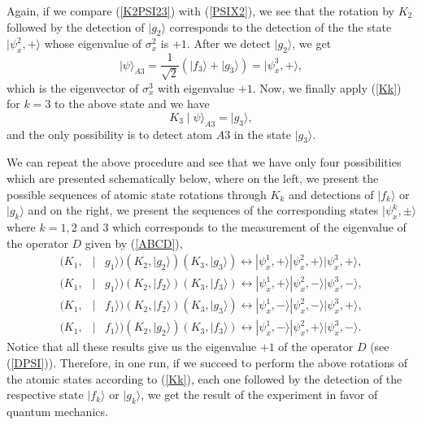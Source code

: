 \documentclass[12pt,thmsa]{article}
\begin{document}
Again, if we compare (\ref{K2PSI23}) with (\ref{PSIX2}), we see that the
rotation by $K_{2}$ followed by the detection of $|g_{2}\rangle $
corresponds to the detection of the the state $|\psi _{x}^{2},+\rangle $
whose eigenvalue of $\sigma _{x}^{2}$ is $+1$. After we detect $%
|g_{2}\rangle $, we get%
\begin{equation}
\mid \psi \rangle _{A3}=\frac{1}{\sqrt{2}}(\mid f_{3}\rangle +\mid
g_{3}\rangle )=|\psi _{x}^{3},+\rangle ,  \label{PSIA3}
\end{equation}%
which is the eigenvector of $\sigma _{x}^{3}$ with eigenvalue $+1$. Now, we
finally apply (\ref{Kk}) for $k=3$ to the above state and we have%
\begin{equation}
K_{3}\mid \psi \rangle _{A3}=\mid g_{3}\rangle ,
\end{equation}%
and the only possibility is to detect atom $A3$ in the state $\mid
g_{3}\rangle .$

We can repeat the above procedure and see that we have only four
possibilities which are presented schematically below, where on the left, we
present the possible sequences of atomic state rotations through $K_{k}$ and
detections of $\mid f_{k}\rangle $ or $\mid g_{k}\rangle $ and on the right,
we present the sequences of the corresponding states $|\psi _{x}^{k},\pm
\rangle $ where $k=1,2$ and $3$ which corresponds to the measurement of the
eigenvalue of the operator $D$ given by (\ref{ABCD}), 
\begin{eqnarray}
(K_{1}, &\mid &g_{1}\rangle )(K_{2},\mid g_{2}\rangle )(K_{3},\mid
g_{3}\rangle )\longleftrightarrow |\psi _{x}^{1},+\rangle |\psi
_{x}^{2},+\rangle |\psi _{x}^{3},+\rangle ,  \nonumber \\
(K_{1}, &\mid &g_{1}\rangle )(K_{2},\mid f_{2}\rangle )(K_{3},\mid
f_{3}\rangle )\longleftrightarrow |\psi _{x}^{1},+\rangle |\psi
_{x}^{2},-\rangle |\psi _{x}^{3},-\rangle ,  \nonumber \\
(K_{1}, &\mid &f_{1}\rangle )(K_{2},\mid f_{2}\rangle )(K_{3},\mid
g_{3}\rangle )\longleftrightarrow |\psi _{x}^{1},-\rangle |\psi
_{x}^{2},-\rangle |\psi _{x}^{3},+\rangle ,  \nonumber \\
(K_{1}, &\mid &f_{1}\rangle )(K_{2},\mid g_{2}\rangle )(K_{3},\mid
f_{3}\rangle )\longleftrightarrow |\psi _{x}^{1},-\rangle |\psi
_{x}^{2},+\rangle |\psi _{x}^{3},-\rangle .  \label{GHZT+}
\end{eqnarray}%
Notice that all these results give us the eigenvalue $+1$ of the operator $D$
(see (\ref{DPSI})). Therefore, in one run, if we succeed to perform the
above rotations of the atomic states according to (\ref{Kk}), each one
followed by the detection of the respective state $\mid f_{k}\rangle $ or $%
\mid g_{k}\rangle $, we get the result of the experiment in favor of quantum
mechanics.
\end{document}
